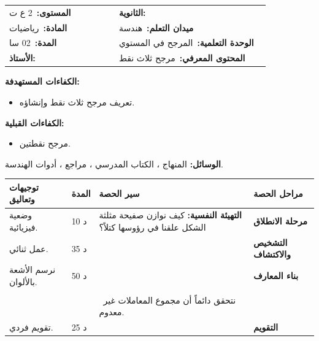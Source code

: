 \documentclass[12pt,a4paper]{article}
\makeatletter
\newenvironment{LTR}{\begin{otherlanguage}{english}}{\end{otherlanguage}}
\newcommand{\ar}[1]{\foreignlanguage{arabic}{#1}}
\newcommand{\Phase}[1]{\textbf{#1}}
\newcommand{\Fld}[2]{\textbf{#1:}\ #2}
\newcommand{\ModhHead}[9]{%
\begin{LTR}
\begin{tcolorbox}[enhanced,colback=white,colframe=cThm!85!black,arc=4mm,boxrule=1pt,top=14pt,bottom=6pt,left=8pt,right=8pt,
 overlay={\node[fill=cThm!85!black,text=white,rounded corners=3mm,inner xsep=14pt,inner ysep=4pt,font=\large\bfseries] at ([yshift=0pt]frame.north){\ar{مذكرة رقم #1}};},
 before upper={\selectlanguage{arabic}}]
\begin{tabular}{@{}p{0.4\linewidth}p{0.55\linewidth}@{}}
\Fld{المستوى}{#2} & \Fld{الثانوية}{\dotfill}\\[3pt]
\Fld{المادة}{رياضيات} & \Fld{ميدان التعلم}{#3}\\[3pt]
\Fld{المدة}{#5} & \Fld{الوحدة التعلمية}{#4}\\[3pt]
\Fld{الأستاذ}{\dotfill} & \Fld{المحتوى المعرفي}{#6}\\
\end{tabular}
\end{tcolorbox}
\begin{tcolorbox}[enhanced,colback=white,colframe=cThm!85!black,arc=3mm,boxrule=0.8pt,sidebyside,sidebyside align=top,lefthand ratio=0.5,
 segmentation style={dashed,cThm!60},before upper={\selectlanguage{arabic}},before lower={\selectlanguage{arabic}}]
\textbf{الكفاءات المستهدفة:}\par #8
\tcblower
\textbf{الكفاءات القبلية:}\par #7
\end{tcolorbox}
\end{LTR}
\par\smallskip\textbf{الوسائل:} #9\par\smallskip}
\newenvironment{Sayr}{%
\begin{LTR}\renewcommand{\arraystretch}{1.25}
\begin{longtable}{|p{0.17\textwidth}|>{\centering\arraybackslash}p{0.06\textwidth}|p{0.53\textwidth}|>{\centering\arraybackslash}p{0.12\textwidth}|}
\hline\rowcolor{cThm!12}\ar{\textbf{توجيهات وتعاليق}} & \ar{\textbf{المدة}} & \ar{\textbf{سير الحصة}} & \ar{\textbf{مراحل الحصة}}\\\hline\endhead
\hline\endfoot}{\end{longtable}\end{LTR}}
\newcommand{\Row}[4]{\ar{\small #4} & \ar{#3} & \ar{#2} & \cellcolor{cThm!8}\ar{\Phase{#1}}\\\hline}
\newcommand{\Lab}[2]{\foreignlanguage{english}{\tcbox[on line,colback=#1,colframe=#1,boxrule=0pt,arc=2pt,boxsep=1pt,left=5pt,right=5pt,top=1pt,bottom=1pt]{\ar{\textcolor{white}{\textbf{#2}}}}}}
\newcommand{\ck}{\ensuremath{{\color{cRem}\checkmark}}}
\makeatother
\begin{document}
\newpage
\ModhHead{26}{2 ع ت}{هندسة}{المرجح في المستوي}{02 سا}{مرجح ثلاث نقط}%
{\begin{itemize}\item مرجح نقطتين.\end{itemize}}%
{\begin{itemize}\item تعريف مرجح ثلاث نقط وإنشاؤه.\end{itemize}}%
{المنهاج ، الكتاب المدرسي ، مراجع ، أدوات الهندسة.}
\begin{Sayr}
\Row{مرحلة الانطلاق}{%
\textbf{التهيئة النفسية:} كيف نوازن صفيحة مثلثة الشكل علقنا في رؤوسها كتلاً؟}{10 د}{وضعية فيزيائية.}
\Row{التشخيص والاكتشاف}{%
\Lab{cEx}{مناقشة نشاط 02 (أنشطة باب المرجح)}\par\ck\ مثلث $ABC$ ونقط معرفة بعلاقات شعاعية: إنشاؤها ، ثم إثبات استقامية نقط بعلاقة شال.\par
}{35 د}{عمل ثنائي.}
\Row{بناء المعارف}{%
\Lab{cDef}{تعريف}\ $\alpha+\beta+\gamma\neq0$: النقطة الوحيدة $G$ حيث $\alpha\overrightarrow{GA}+\beta\overrightarrow{GB}+\gamma\overrightarrow{GC}=\vec0$ هي مرجح $\{(A;\alpha),(B;\beta),(C;\gamma)\}$.\par\Lab{cThm}{خاصية}\ من أجل كل نقطة $M$: $\alpha\overrightarrow{MA}+\beta\overrightarrow{MB}+\gamma\overrightarrow{MC}=(\alpha+\beta+\gamma)\overrightarrow{MG}$ ؛ وبأخذ $M=A$: $\overrightarrow{AG}=\dfrac{\beta\overrightarrow{AB}+\gamma\overrightarrow{AC}}{\alpha+\beta+\gamma}$.\par}{50 د}{نرسم الأشعة بالألوان.}
\Row{}{%
\Lab{cEx}{مثال}\ $G$ مرجح $\{(A;1),(B;1),(C;1)\}$: $\overrightarrow{AG}=\frac13(\overrightarrow{AB}+\overrightarrow{AC})$ ، و $G$ مركز ثقل المثلث.\par\Lab{cDef}{مركز المسافات المتساوية}\ مرجح نقط معاملاتها متساوية.\par}{}{}
\Row{}{%
\Lab{cThm!80!black}{حذار}\ نتحقق دائماً أن مجموع المعاملات غير معدوم.}{}{}
\Row{التقويم}{%
\Lab{cEx}{تطبيق}\par أنشئ $G$ مرجح $\{(A;2),(B;1),(C;1)\}$.\par\textbf{الحل:} $\overrightarrow{AG}=\dfrac{\overrightarrow{AB}+\overrightarrow{AC}}4$ ؛ إذا كانت $I$ منتصف $[BC]$: $\overrightarrow{AB}+\overrightarrow{AC}=2\overrightarrow{AI}$ ، إذن $\overrightarrow{AG}=\frac12\overrightarrow{AI}$.\par\textbf{واجب منزلي:} تمارين 38 إلى 44 من باب المرجح.\par\smallskip\textbf{ملاحظات حول سير الحصة:} \dotfill}{25 د}{تقويم فردي.}
\end{Sayr}
\newpage
\end{document}

